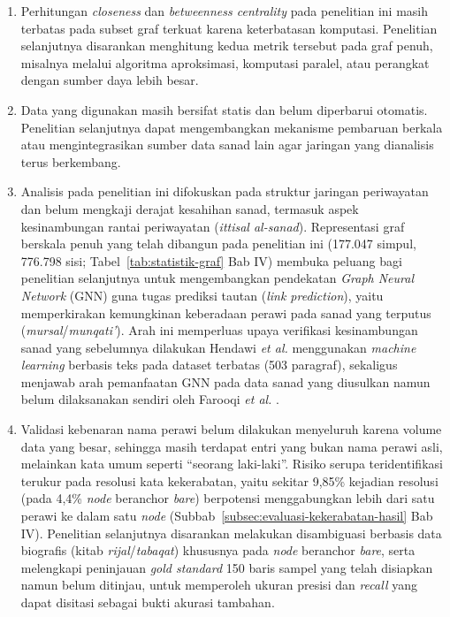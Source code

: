 \begin{enumerate}
	\item Perhitungan \textit{closeness} dan \textit{betweenness centrality} pada penelitian ini masih terbatas pada subset graf terkuat karena keterbatasan komputasi. Penelitian selanjutnya disarankan menghitung kedua metrik tersebut pada graf penuh, misalnya melalui algoritma aproksimasi, komputasi paralel, atau perangkat dengan sumber daya lebih besar.

	\item Data yang digunakan masih bersifat statis dan belum diperbarui otomatis. Penelitian selanjutnya dapat mengembangkan mekanisme pembaruan berkala atau mengintegrasikan sumber data sanad lain agar jaringan yang dianalisis terus berkembang.

	\item Analisis pada penelitian ini difokuskan pada struktur jaringan periwayatan dan belum mengkaji derajat kesahihan sanad, termasuk aspek kesinambungan rantai periwayatan (\textit{ittisal al-sanad}). Representasi graf berskala penuh yang telah dibangun pada penelitian ini (177.047 simpul, 776.798 sisi; Tabel~\ref{tab:statistik-graf} Bab IV) membuka peluang bagi penelitian selanjutnya untuk mengembangkan pendekatan \textit{Graph Neural Network} (GNN) guna tugas prediksi tautan (\textit{link prediction}), yaitu memperkirakan kemungkinan keberadaan perawi pada sanad yang terputus (\textit{mursal}/\textit{munqati'}). Arah ini memperluas upaya verifikasi kesinambungan sanad yang sebelumnya dilakukan Hendawi \textit{et al.} \cite{10974901} menggunakan \textit{machine learning} berbasis teks pada dataset terbatas (503 paragraf), sekaligus menjawab arah pemanfaatan GNN pada data sanad yang diusulkan namun belum dilaksanakan sendiri oleh Farooqi \textit{et al.} \cite{FAROOQI2024110439}.

	\item Validasi kebenaran nama perawi belum dilakukan menyeluruh karena volume data yang besar, sehingga masih terdapat entri yang bukan nama perawi asli, melainkan kata umum seperti ``seorang laki-laki''. Risiko serupa teridentifikasi terukur pada resolusi kata kekerabatan, yaitu sekitar 9,85\% kejadian resolusi (pada 4,4\% \textit{node} beranchor \textit{bare}) berpotensi menggabungkan lebih dari satu perawi ke dalam satu \textit{node} (Subbab~\ref{subsec:evaluasi-kekerabatan-hasil} Bab IV). Penelitian selanjutnya disarankan melakukan disambiguasi berbasis data biografis (kitab \textit{rijal}/\textit{tabaqat}) khususnya pada \textit{node} beranchor \textit{bare}, serta melengkapi peninjauan \textit{gold standard} 150 baris sampel yang telah disiapkan namun belum ditinjau, untuk memperoleh ukuran presisi dan \textit{recall} yang dapat disitasi sebagai bukti akurasi tambahan.


\end{enumerate}
